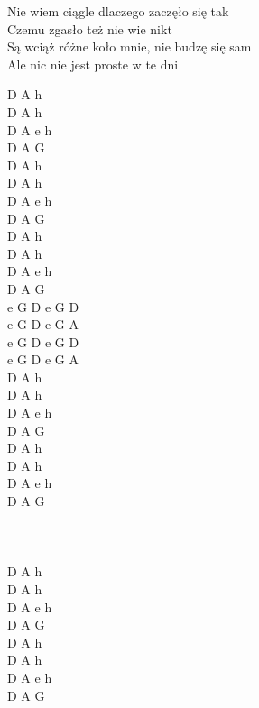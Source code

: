 \documentclass[a5paper, 10pt]{book}
\begin{document}
\begin{minipage}[t]{0.6\textwidth}
Nie wiem ciągle dlaczego zaczęło się tak\\
Czemu zgasło też nie wie nikt\\
Są wciąż różne koło mnie, nie budzę się sam\\
Ale nic nie jest proste w te dni\\

\end{minipage}
\begin{minipage}[t]{0.4\textwidth}
D A h\\
D A h\\
D A e h\\
D A G\\

D A h\\
D A h\\
D A e h\\
D A G\\

D A h\\
D A h\\
D A e h\\
D A G\\

\hspace*{3mm} e G D e G D\\
\hspace*{3mm} e G D e G A\\
\hspace*{3mm} e G D e G D\\
\hspace*{3mm} e G D e G A\\

D A h\\
D A h\\
D A e h\\
D A G\\

D A h\\
D A h\\
D A e h\\
D A G\\
~\\~\\~\\
D A h\\
D A h\\
D A e h\\
D A G\\

D A h\\
D A h\\
D A e h\\
D A G\\
\end{minipage}
\end{document}

